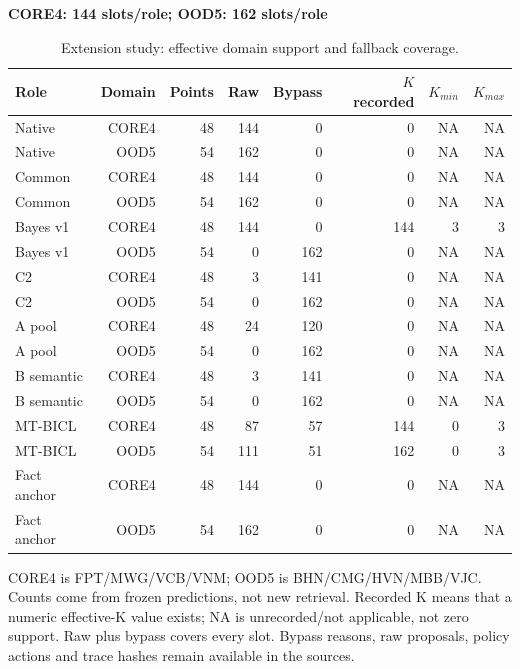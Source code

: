 \begin{table}[!htb]
\centering\small
\setlength{\tabcolsep}{3pt}
\renewcommand{\arraystretch}{1.12}
\caption{Extension study: effective domain support and fallback coverage.}
\label{tab:u09-support}
\textbf{CORE4: 144 slots/role; OOD5: 162 slots/role}\par\smallskip
\begin{tabular}{lrrrrrrr}
\hline
Role & Domain & Points & Raw & Bypass & $K$ recorded & $K_{min}$ & $K_{max}$ \\
\hline
Native & CORE4 & 48 & 144 & 0 & 0 & NA & NA \\
Native & OOD5 & 54 & 162 & 0 & 0 & NA & NA \\
Common & CORE4 & 48 & 144 & 0 & 0 & NA & NA \\
Common & OOD5 & 54 & 162 & 0 & 0 & NA & NA \\
Bayes v1 & CORE4 & 48 & 144 & 0 & 144 & 3 & 3 \\
Bayes v1 & OOD5 & 54 & 0 & 162 & 0 & NA & NA \\
C2 & CORE4 & 48 & 3 & 141 & 0 & NA & NA \\
C2 & OOD5 & 54 & 0 & 162 & 0 & NA & NA \\
A pool & CORE4 & 48 & 24 & 120 & 0 & NA & NA \\
A pool & OOD5 & 54 & 0 & 162 & 0 & NA & NA \\
B semantic & CORE4 & 48 & 3 & 141 & 0 & NA & NA \\
B semantic & OOD5 & 54 & 0 & 162 & 0 & NA & NA \\
MT-BICL & CORE4 & 48 & 87 & 57 & 144 & 0 & 3 \\
MT-BICL & OOD5 & 54 & 111 & 51 & 162 & 0 & 3 \\
Fact anchor & CORE4 & 48 & 144 & 0 & 0 & NA & NA \\
Fact anchor & OOD5 & 54 & 162 & 0 & 0 & NA & NA \\
\hline
\end{tabular}\par\medskip
\begin{minipage}{\textwidth}\footnotesize CORE4 is FPT/MWG/VCB/VNM; OOD5 is BHN/CMG/HVN/MBB/VJC. Counts come from frozen predictions, not new retrieval. Recorded K means that a numeric effective-K value exists; NA is unrecorded/not applicable, not zero support. Raw plus bypass covers every slot. Bypass reasons, raw proposals, policy actions and trace hashes remain available in the sources.\end{minipage}
\end{table}
